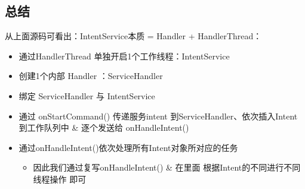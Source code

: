 \documentclass[9pt, b5paper]{article}
\begin{document}
\subsection{总结}
\label{sec-4-8}
从上面源码可看出：IntentService本质 = Handler + HandlerThread：
\begin{itemize}
\item 通过HandlerThread 单独开启1个工作线程：IntentService
\item 创建1个内部 Handler ：ServiceHandler
\item 绑定 ServiceHandler 与 IntentService
\item 通过 onStartCommand() 传递服务intent 到ServiceHandler、依次插入Intent到工作队列中 \& 逐个发送给 onHandleIntent()
\item 通过onHandleIntent()依次处理所有Intent对象所对应的任务
\begin{itemize}
\item 因此我们通过复写onHandleIntent() \& 在里面 根据Intent的不同进行不同线程操作 即可
\end{itemize}
\end{itemize}
\end{document}
